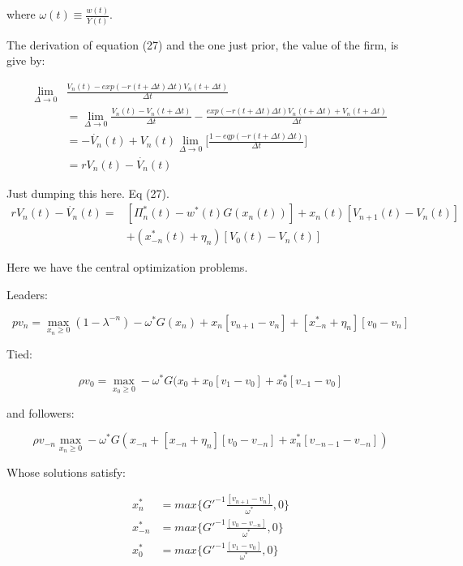 \documentclass[11pt]{article}
\begin{document}
  where $\omega(t) \equiv \frac{w(t)}{Y(t)}$.

  The derivation of equation (27) and the one just prior, the value of the firm, is give by:

  \begin{align} \label{eq:firm_value}
    \lim_{\Delta \rightarrow 0}& \frac{V_n(t) - exp(-r(t + \Delta t)\Delta t)V_n(t + \Delta t)}{\Delta t}\\
    &= \lim_{\Delta \rightarrow 0} \frac{V_n(t) - V_n(t + \Delta t)}{\Delta t} - \frac{exp(-r(t + \Delta t)\Delta t)V_n(t + \Delta t) + V_n(t + \Delta t)}{\Delta t}\\
    &= -\dot{V_n}(t) + V_n(t) \lim_{\Delta \rightarrow 0}\Big[\frac{1 - eqp(-r(t + \Delta t)\Delta t)}{\Delta t}]\\
    &= rV_n(t) - \dot{V_n}(t)
  \end{align}

Just dumping this here. Eq (27).
      \begin{align*}
        rV_n(t) - \dot{V_n}(t) = &[\Pi_n^*(t) - w^*(t)G(x_n(t))] + x_n(t)[V_{n+1}(t) - V_n(t)] \\
                                 &+ (x_{-n}^*(t) + \eta_n)[V_0(t) - V_n(t)]
      \end{align*}

  Here we have the central optimization problems.

  Leaders:

  \begin{equation} \label{eq:rvf_leader}  %
    pv_n = \max_{x_n \geq 0} (1 - \lambda^{-n}) - \omega^*G(x_n) + x_n[v_{n+1} - v_n] + [x_{-n}^* + \eta_n][v_0 - v_n]
  \end{equation}

  Tied:

  \begin{equation} \label{eq:rvf_tied}
    \rho v_0 = \max_{x_0 \geq 0} -\omega^*G(x_{0} + x_{0}[v_1 - v_0] + x_0^*[v_{-1} - v_0]
  \end{equation}

  and followers:

  \begin{equation} \label{eq:rvf_follower}
    \rho v_{-n} \max_{x_n \geq 0} -\omega^*G(x_{-n} + [x_{-n} + \eta_n][v_0 - v_{-n}] + x_n^*[v_{-n-1} - v_{-n}])
    \end{equation}

  Whose solutions satisfy:

  \begin{align} \label{eq:ss_rd_policies}
    x_n^*    &= max \big\{G'^{-1}\frac{[v_{n+1} - v_n]}{\omega^*}   ,0\}\\ 
    x_{-n}^* &= max \big\{G'^{-1}\frac{[v_0  - v_{-n}]}{\omega^*}   ,0\}\\
    x_0^*    &= max \big\{G'^{-1}\frac{[v_1     - v_0]}{\omega^*}   ,0\}
  \end{align}
  
\end{document}
